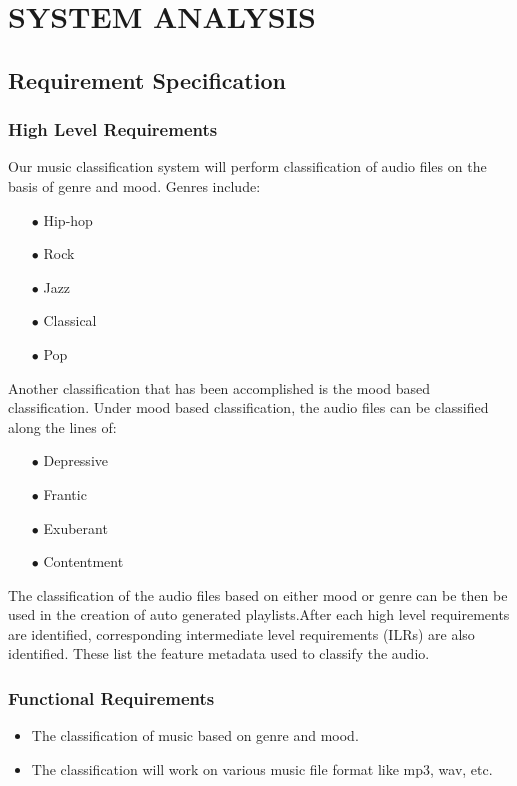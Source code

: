 \newpage
\section{SYSTEM ANALYSIS}
\subsection{Requirement Specification}
\subsubsection{High Level Requirements}
    Our music classification system will perform classification of audio files on the basis of genre and mood. Genres include:
    \begin{itemize}
    \item[$\bullet$] Hip-hop
    \item[$\bullet$] Rock
    \item[$\bullet$] Jazz
    \item[$\bullet$] Classical
    \item[$\bullet$] Pop
    \end{itemize}
    Another classification that has been accomplished is the mood based classification. Under mood based classification, the audio files can be classified along the lines of:
    \begin{itemize}
    \item[$\bullet$] Depressive
    \item[$\bullet$] Frantic
    \item[$\bullet$] Exuberant
    \item[$\bullet$] Contentment
    \end{itemize}
    The classification of the audio files based on either mood or genre can be then be used in the creation of auto generated playlists.After each high level requirements are identified, corresponding intermediate level requirements
    (ILRs) are also identified. These list the feature metadata used to classify the audio.
\subsubsection{Functional Requirements}
\begin{itemize}
        \item The classification of music based on genre and mood.
        \item The classification will work on various music file format like mp3, wav, etc.
        \end{itemize}


